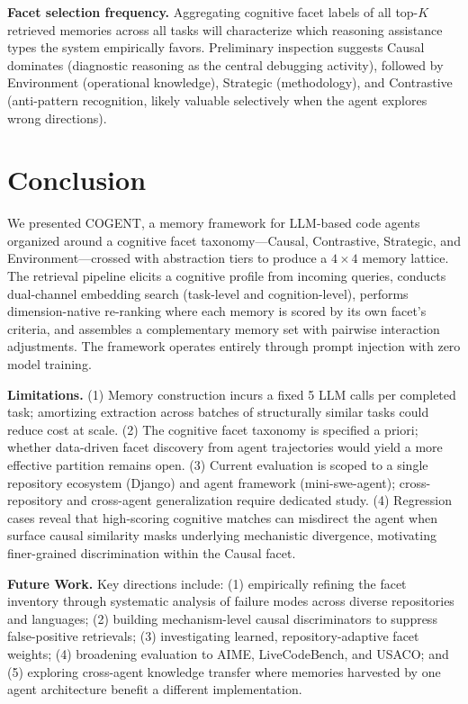 \documentclass[letterpaper]{article} %
\begin{document}
\textbf{Facet selection frequency.} Aggregating cognitive facet labels of all top-$K$ retrieved memories across all tasks will characterize which reasoning assistance types the system empirically favors. Preliminary inspection suggests Causal dominates (diagnostic reasoning as the central debugging activity), followed by Environment (operational knowledge), Strategic (methodology), and Contrastive (anti-pattern recognition, likely valuable selectively when the agent explores wrong directions).

\section{Conclusion}

We presented \textsc{COGENT}, a memory framework for LLM-based code agents organized around a cognitive facet taxonomy---Causal, Contrastive, Strategic, and Environment---crossed with abstraction tiers to produce a $4 \times 4$ memory lattice. The retrieval pipeline elicits a cognitive profile from incoming queries, conducts dual-channel embedding search (task-level and cognition-level), performs dimension-native re-ranking where each memory is scored by its own facet's criteria, and assembles a complementary memory set with pairwise interaction adjustments. The framework operates entirely through prompt injection with zero model training.

\textbf{Limitations.} (1) Memory construction incurs a fixed 5 LLM calls per completed task; amortizing extraction across batches of structurally similar tasks could reduce cost at scale. (2) The cognitive facet taxonomy is specified a priori; whether data-driven facet discovery from agent trajectories would yield a more effective partition remains open. (3) Current evaluation is scoped to a single repository ecosystem (Django) and agent framework (mini-swe-agent); cross-repository and cross-agent generalization require dedicated study. (4) Regression cases reveal that high-scoring cognitive matches can misdirect the agent when surface causal similarity masks underlying mechanistic divergence, motivating finer-grained discrimination within the Causal facet.

\textbf{Future Work.} Key directions include: (1) empirically refining the facet inventory through systematic analysis of failure modes across diverse repositories and languages; (2) building mechanism-level causal discriminators to suppress false-positive retrievals; (3) investigating learned, repository-adaptive facet weights; (4) broadening evaluation to AIME, LiveCodeBench, and USACO; and (5) exploring cross-agent knowledge transfer where memories harvested by one agent architecture benefit a different implementation.
\end{document}
